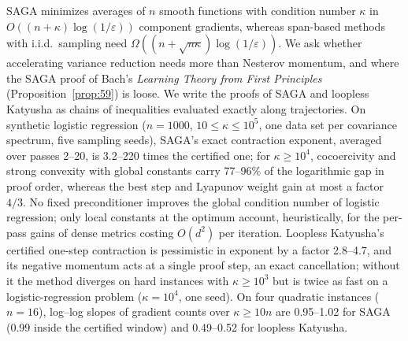 SAGA minimizes averages of $n$ smooth functions with condition number $\kappa$ in
$O((n+\kappa)\log(1/\varepsilon))$ component gradients, whereas span-based methods with i.i.d.\ sampling need
$\Omega((n+\sqrt{n\kappa})\log(1/\varepsilon))$. We ask whether accelerating variance reduction needs more than
Nesterov momentum, and where the SAGA proof of Bach's \emph{Learning Theory from First Principles}
(Proposition~\ref{prop:59}) is loose. We write the proofs of SAGA and loopless Katyusha as chains of inequalities evaluated exactly along
trajectories. On synthetic logistic regression ($n=1000$, $10\le\kappa\le10^5$, one data set per covariance spectrum,
five sampling seeds), SAGA's exact contraction exponent, averaged over passes 2--20, is 3.2--220 times the certified
one; for $\kappa\ge10^4$, cocoercivity and strong convexity with global constants carry 77--96\% of the logarithmic
gap in proof order, whereas the best step and Lyapunov weight gain at most a factor $4/3$. No fixed
preconditioner improves the global condition number of logistic regression; only local constants at the optimum
account, heuristically, for the per-pass gains of dense metrics costing $O(d^2)$ per iteration. Loopless
Katyusha's certified one-step contraction is pessimistic in exponent by a factor 2.8--4.7, and its negative momentum
acts at a single proof step, an exact cancellation; without it the method diverges on hard instances with
$\kappa\ge10^3$ but is twice as fast on a logistic-regression problem ($\kappa=10^4$, one seed). On four quadratic
instances ($n=16$), log--log slopes of gradient counts over $\kappa\ge10n$ are 0.95--1.02 for SAGA (0.99 inside the
certified window) and 0.49--0.52 for loopless Katyusha.
